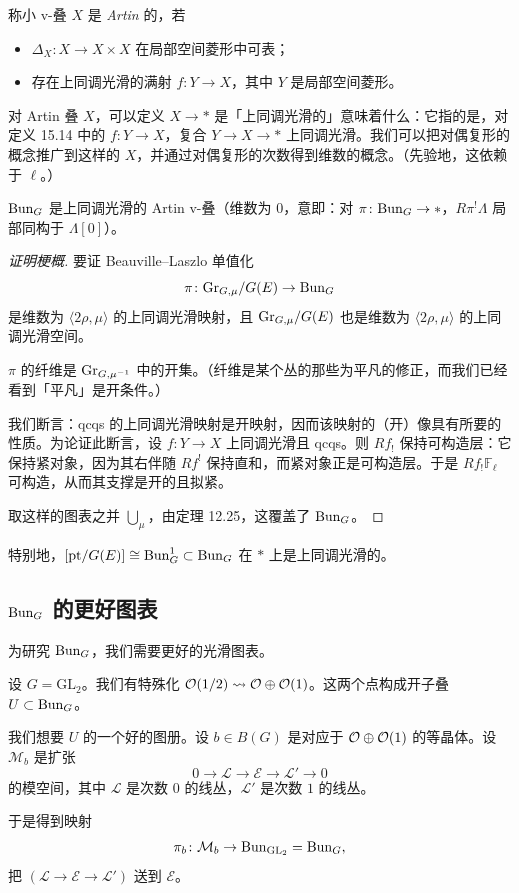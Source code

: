 \begin{definition}
称小 v-叠 $X$ 是 \emph{Artin} 的，若
\begin{itemize}
\item $\Delta_X\colon X\to X\times X$ 在局部空间菱形中可表；
\item 存在上同调光滑的满射 $f\colon Y\to X$，其中 $Y$ 是局部空间菱形。
\end{itemize}
\end{definition}

对 Artin 叠 $X$，可以定义 $X\to*$ 是「上同调光滑的」意味着什么：它指的是，对定义 15.14 中的 $f\colon Y\to X$，复合 $Y\to X\to*$ 上同调光滑。我们可以把对偶复形的概念推广到这样的 $X$，并通过对偶复形的次数得到维数的概念。（先验地，这依赖于 $\ell$。）

\begin{theorem}
$\mathrm{Bun}_G$ 是上同调光滑的 Artin v-叠（维数为 $0$，意即：对 $\pi\colon\mathrm{Bun}_G\to*$，$R\pi^!\Lambda$ 局部同构于 $\Lambda[0]$）。
\end{theorem}

\begin{proof}[证明梗概]
要证 Beauville--Laszlo 单值化
\[
\pi\colon\mathrm{Gr}_{G,\mu}/G(E)\to\mathrm{Bun}_G
\]
是维数为 $\langle2\rho,\mu\rangle$ 的上同调光滑映射，且 $\mathrm{Gr}_{G,\mu}/G(E)$ 也是维数为 $\langle2\rho,\mu\rangle$ 的上同调光滑空间。

$\pi$ 的纤维是 $\mathrm{Gr}_{G,\mu^{-1}}$ 中的开集。（纤维是某个丛的那些为平凡的修正，而我们已经看到「平凡」是开条件。）

我们断言：qcqs 的上同调光滑映射是开映射，因而该映射的（开）像具有所要的性质。为论证此断言，设 $f\colon Y\to X$ 上同调光滑且 qcqs。则 $Rf_!$ 保持可构造层：它保持紧对象，因为其右伴随 $Rf^!$ 保持直和，而紧对象正是可构造层。于是 $Rf_!\mathbb{F}_\ell$ 可构造，从而其支撑是开的且拟紧。

取这样的图表之并 $\bigcup_\mu$，由定理 12.25，这覆盖了 $\mathrm{Bun}_G$。
\end{proof}

\begin{example}
特别地，$[\mathrm{pt}/G(E)]\cong\mathrm{Bun}^1_G\subset\mathrm{Bun}_G$ 在 $*$ 上是上同调光滑的。
\end{example}

\subsection{$\mathrm{Bun}_G$ 的更好图表}

为研究 $\mathrm{Bun}_G$，我们需要更好的光滑图表。

\begin{example}
设 $G=\mathrm{GL}_2$。我们有特殊化 $\mathcal{O}(1/2)\rightsquigarrow\mathcal{O}\oplus\mathcal{O}(1)$。这两个点构成开子叠 $U\subset\mathrm{Bun}_G$。

我们想要 $U$ 的一个好的图册。设 $b\in B(G)$ 是对应于 $\mathcal{O}\oplus\mathcal{O}(1)$ 的等晶体。设 $\mathcal M_b$ 是扩张
\[
0\to\mathcal L\to\mathcal E\to\mathcal L'\to0
\]
的模空间，其中 $\mathcal L$ 是次数 $0$ 的线丛，$\mathcal L'$ 是次数 $1$ 的线丛。

于是得到映射
\[
\pi_b\colon\mathcal M_b\to\mathrm{Bun}_{\mathrm{GL}_2}=\mathrm{Bun}_G,
\]
把 $(\mathcal L\to\mathcal E\to\mathcal L')$ 送到 $\mathcal E$。
\end{example}

